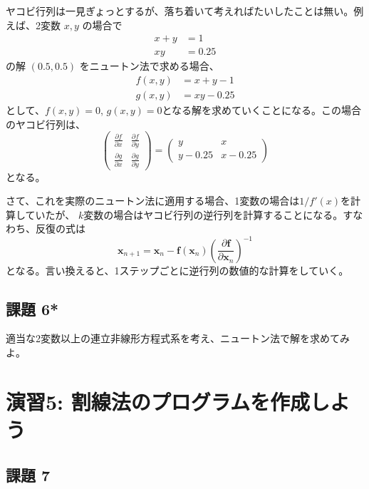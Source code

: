 \documentclass[a4paper]{jsarticle}
\begin{document}
ヤコビ行列は一見ぎょっとするが、落ち着いて考えればたいしたことは無い。例えば、2変数 $x, y$ の場合で
\begin{equation*}
\begin{split}
x + y &= 1\\
xy & = 0.25
\end{split}
\end{equation*}
の解 $(0.5, 0.5)$ をニュートン法で求める場合、
\begin{equation*}
\begin{split}
f(x, y) &= x + y - 1 \\
g(x, y) &= xy - 0.25
\end{split}
\end{equation*}
として、$f(x, y) = 0$, $g(x, y) = 0$となる解を求めていくことになる。この場合のヤコビ行列は、
\begin{equation*}
\begin{pmatrix}
\frac{\partial f}{\partial x} & \frac{\partial f}{\partial y}\\
\frac{\partial g}{\partial x} & \frac{\partial g}{\partial y}
\end{pmatrix}
=
\begin{pmatrix}
y & x\\
y-0.25 & x-0.25
\end{pmatrix}
\end{equation*}
となる。

さて、これを実際のニュートン法に適用する場合、1変数の場合は$1/f'(x)$を計算していたが、
$k$変数の場合はヤコビ行列の逆行列を計算することになる。すなわち、反復の式は
\begin{equation*}
\mathbf{x}_{n+1} = \mathbf{x}_{n} - \mathbf{f}(\mathbf{x}_{n})\left(\frac{\partial\mathbf{f}}{\partial\mathbf{x}_{n}}\right)^{-1}
\end{equation*}
となる。言い換えると、1ステップごとに逆行列の数値的な計算をしていく。

\subsection*{課題 6*}

適当な2変数以上の連立非線形方程式系を考え、ニュートン法で解を求めてみよ。

\section*{演習5: 割線法のプログラムを作成しよう}

\subsection*{課題 7}
\end{document}

